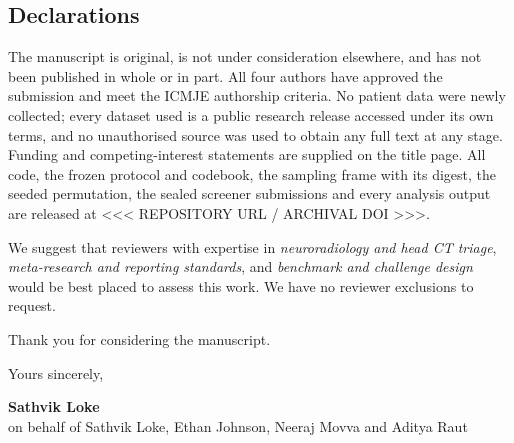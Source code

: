 \documentclass[11pt,a4paper]{article}
\begin{document}
\subsection*{Declarations}

The manuscript is original, is not under consideration elsewhere, and has not been
published in whole or in part. All four authors have approved the submission and meet
the ICMJE authorship criteria. No patient data were newly collected; every dataset used
is a public research release accessed under its own terms, and no unauthorised source
was used to obtain any full text at any stage. Funding and competing-interest
statements are supplied on the title page. All code, the frozen protocol and codebook,
the sampling frame with its digest, the seeded permutation, the sealed screener
submissions and every analysis output are released at
<<< REPOSITORY URL / ARCHIVAL DOI >>>.

We suggest that reviewers with expertise in \emph{neuroradiology and head CT triage},
\emph{meta-research and reporting standards}, and \emph{benchmark and challenge design}
would be best placed to assess this work. We have no reviewer exclusions to request.

Thank you for considering the manuscript.

\vspace{1.5em}

\noindent Yours sincerely,

\vspace{2.5em}

\noindent
\textbf{Sathvik Loke}\\
on behalf of Sathvik Loke, Ethan Johnson, Neeraj Movva and Aditya Raut
\end{document}
